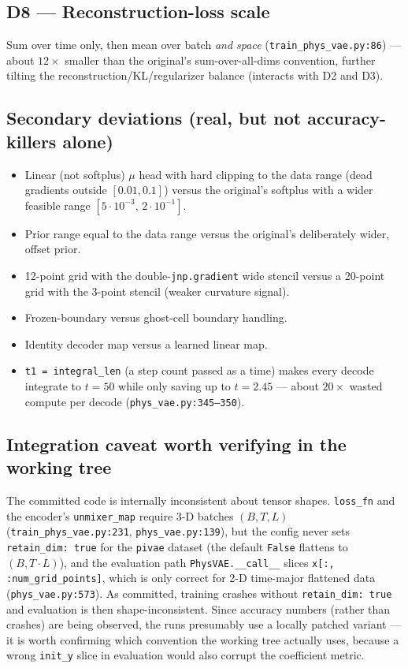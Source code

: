 \documentclass[11pt,a4paper]{article}
\newcommand{\code}[1]{\texttt{#1}}
\begin{document}
\subsection*{D8 --- Reconstruction-loss scale}

Sum over time only, then mean over batch \emph{and space}
(\code{train\_phys\_vae.py:86}) --- about $12\times$ smaller than the original's
sum-over-all-dims convention, further tilting the reconstruction/KL/regularizer
balance (interacts with D2 and D3).

\subsection*{Secondary deviations (real, but not accuracy-killers alone)}

\begin{itemize}[nosep]
  \item Linear (not softplus) $\mu$ head with hard clipping to the data range
        (dead gradients outside $[0.01, 0.1]$) versus the original's softplus with a
        wider feasible range $[5\cdot10^{-3},\,2\cdot10^{-1}]$.
  \item Prior range equal to the data range versus the original's deliberately wider,
        offset prior.
  \item 12-point grid with the double-\code{jnp.gradient} wide stencil versus a
        20-point grid with the 3-point stencil (weaker curvature signal).
  \item Frozen-boundary versus ghost-cell boundary handling.
  \item Identity decoder map versus a learned linear map.
  \item \code{t1 = integral\_len} (a step count passed as a time) makes every decode
        integrate to $t = 50$ while only saving up to $t = 2.45$ --- about $20\times$
        wasted compute per decode (\code{phys\_vae.py:345--350}).
\end{itemize}

\subsection*{Integration caveat worth verifying in the working tree}

The committed code is internally inconsistent about tensor shapes.
\code{loss\_fn} and the encoder's \code{unmixer\_map} require 3-D batches
$(B, T, L)$ (\code{train\_phys\_vae.py:231}, \code{phys\_vae.py:139}), but the config
never sets \code{retain\_dim: true} for the \code{pivae} dataset (the default
\code{False} flattens to $(B, T\cdot L)$), and the evaluation path
\code{PhysVAE.\_\_call\_\_} slices \code{x[:, :num\_grid\_points]}, which is only
correct for 2-D time-major flattened data (\code{phys\_vae.py:573}). As committed,
training crashes without \code{retain\_dim: true} and evaluation is then
shape-inconsistent. Since accuracy numbers (rather than crashes) are being observed,
the runs presumably use a locally patched variant --- it is worth confirming which
convention the working tree actually uses, because a wrong \code{init\_y} slice in
evaluation would also corrupt the coefficient metric.
\end{document}
